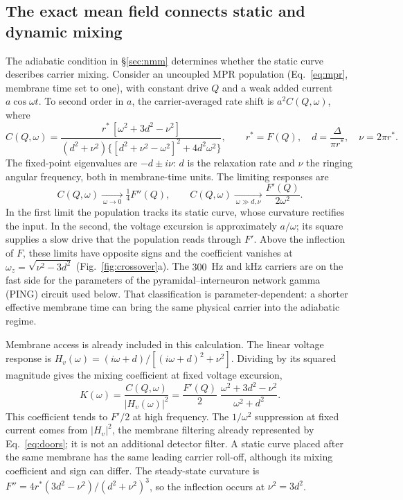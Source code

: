 \documentclass[11pt,a4paper]{article}
\begin{document}
\subsection{The exact mean field connects static and dynamic mixing}\label{sec:dynamic}
The adiabatic condition in \S\ref{sec:nmm} determines whether the static curve describes
carrier mixing. Consider an uncoupled MPR population (Eq.~\eqref{eq:mpr}, membrane
time set to one), with constant drive $Q$ and a weak added current $a\cos\omega t$.
To second order in $a$, the carrier-averaged rate shift is $a^2C(Q,\omega)$, where
\begin{equation}
C(Q,\omega)=\frac{r^*\,[\omega^2+3d^2-\nu^2]}{(d^2+\nu^2)\{[d^2+\nu^2-\omega^2]^2+4d^2\omega^2\}},
\qquad r^*=F(Q),\quad d=\frac{\Delta}{\pi r^*},\quad \nu=2\pi r^*.
\label{eq:crossover}
\end{equation}
The fixed-point eigenvalues are $-d\pm i\nu$: $d$ is the relaxation rate and $\nu$
the ringing angular frequency, both in membrane-time units. The limiting responses are
\begin{equation}
C(Q,\omega)\xrightarrow[\ \omega\to0\ ]{}\tfrac14F''(Q),\qquad
C(Q,\omega)\xrightarrow[\ \omega\gg d,\nu\ ]{}\frac{F'(Q)}{2\omega^2}.
\label{eq:crossover_limits}
\end{equation}
In the first limit the population tracks its static curve, whose curvature rectifies
the input. In the second, the voltage excursion is approximately $a/\omega$; its
square supplies a slow drive that the population reads through $F'$. Above the
inflection of $F$, these limits have opposite signs and the coefficient vanishes at
$\omega_z=\sqrt{\nu^2-3d^2}$ (Fig.~\ref{fig:crossover}a). The $300$~Hz and kHz carriers
are on the fast side for the parameters of the pyramidal--interneuron network gamma
(PING) circuit used below. That classification is
parameter-dependent: a shorter effective membrane time can bring the same physical
carrier into the adiabatic regime.

Membrane access is already included in this calculation. The linear voltage response
is $H_v(\omega)=(i\omega+d)/[(i\omega+d)^2+\nu^2]$. Dividing by its squared magnitude
gives the mixing coefficient at fixed voltage excursion,
\begin{equation}
K(\omega)=\frac{C(Q,\omega)}{|H_v(\omega)|^2}
=\frac{F'(Q)}{2}\;\frac{\omega^2+3d^2-\nu^2}{\omega^2+d^2}.
\label{eq:kfixed}
\end{equation}
This coefficient tends to $F'/2$ at high frequency. The $1/\omega^2$ suppression
at fixed current comes from $|H_v|^2$, the membrane filtering already represented
by Eq.~\eqref{eq:doors}; it is not an additional detector filter. A static curve
placed after the same membrane has the same leading carrier roll-off, although
its mixing coefficient and sign can differ. The steady-state curvature is
$F''=4r^*(3d^2-\nu^2)/(d^2+\nu^2)^3$, so the inflection occurs at $\nu^2=3d^2$.
\end{document}
